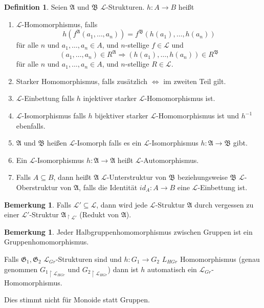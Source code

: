 \documentclass[12pt,parskip=full]{scrartcl}
\theoremstyle{definition}
\newtheorem{definition}[theorem]{Definition}
\newtheorem{remark}[theorem]{Bemerkung}
\begin{document}
	\begin{definition}
		Seien $\mathfrak{A}$ und $\mathfrak{B}$ $\mathcal{L}$-Strukturen. $h: A \to B$ heißt
		\begin{enumerate}[label=\alph*)]
			\item $\mathcal{L}$-Homomorphismus, falls
			\begin{equation*}
				h(f^\mathfrak{A}(a_1, \dots, a_n)) = f^\mathfrak{B}(h(a_1), \dots, h(a_n))
			\end{equation*}
			für alle $n$ und $a_1, \dots, a_n \in A$, und $n$-stellige $f \in \mathcal{L}$ und
			\begin{equation*}
				(a_1, \dots, a_n) \in R^\mathfrak{A} \Rightarrow (h(a_1), \dots, h(a_n)) \in R^\mathfrak{B}
			\end{equation*}
			für alle $n$ und $a_1, \dots, a_n \in A$, und $n$-stellige $R \in \mathcal{L}$.
			\item Starker Homomorphismus, falls zusätzlich $\Leftrightarrow$ im zweiten Teil gilt.
			\item $\mathcal{L}$-Einbettung falls $h$ injektiver starker $\mathcal{L}$-Homomorphismus ist.
			\item $\mathcal{L}$-Isomorphismus falls $h$ bijektiver starker $\mathcal{L}$-Homomorphismus ist und $h^{-1}$ ebenfalls.
			\item $\mathfrak{A}$ und $\mathfrak{B}$ heißen $\mathcal{L}$-Isomorph falls es ein $\mathcal{L}$-Isomorphismus $h: \mathfrak{A} \to \mathfrak{B}$ gibt.
			\item Ein $\mathcal{L}$-Isomorphismus $h: \mathfrak{A} \to \mathfrak{A}$ heißt $\mathcal{L}$-Automorphismus.
			\item Falls $A \subseteq B$, dann heißt $\mathfrak{A}$ $\mathcal{L}$-Unterstruktur von $\mathfrak{B}$ beziehungsweise $\mathfrak{B}$ $\mathcal{L}$-Oberstruktur von $\mathfrak{A}$, falls die Identität $id_A: A \to B$ eine $\mathcal{L}$-Einbettung ist.
		\end{enumerate}
	\end{definition}

	\begin{remark}
		Falls $\mathcal{L}' \subseteq \mathcal{L}$, dann wird jede $\mathcal{L}$-Struktur $\mathfrak{A}$ durch vergessen zu einer $\mathcal{L}'$-Struktur $\mathfrak{A}_{\upharpoonright \mathcal{L}'}$ (Redukt von $\mathfrak{A}$).
	\end{remark}

	\begin{remark}
		Jeder Halbgruppenhomomorphismus zwischen Gruppen ist ein Gruppenhomomorphismus.
		
		Falls $\mathfrak{G}_1, \mathfrak{G}_2$ $\mathcal{L}_{Gr}$-Strukturen sind und $h: G_1 \to G_2$ $L_{HGr}$ Homomorphismus (genau genommen ${G_1}_{\upharpoonright \mathcal{L}_{HGr}}$ und ${G_2}_{\upharpoonright \mathcal{L}_{HGr}}$) dann ist $h$ automatisch ein $\mathcal{L}_{Gr}$-Homomorphismus.
		
		Dies stimmt nicht für Monoide statt Gruppen.
	\end{remark}
\end{document}
